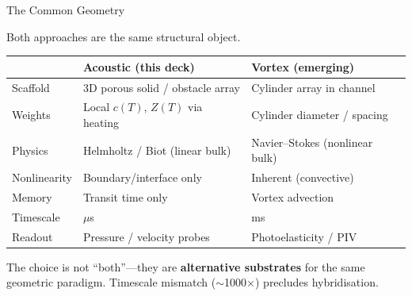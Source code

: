 \documentclass[aspectratio=169,11pt]{beamer}
\begin{document}
\begin{frame}{The Common Geometry}
  \begin{center}
    \textcolor{gdpPurple}{\large Both approaches are the same structural object.}
  \end{center}

  \vspace{0.2cm}
  \footnotesize
  \begin{table}
    \centering
    \renewcommand{\arraystretch}{1.05}
    \begin{tabular}{@{}>{\raggedright}p{3.0cm}>{\raggedright}p{4.8cm}>{\raggedright\arraybackslash}p{5.2cm}@{}}
      \toprule
      & \textbf{Acoustic (this deck)} & \textbf{Vortex (emerging)} \\
      \midrule
      Scaffold & 3D porous solid / obstacle array & Cylinder array in channel \\
      Weights & Local $c(T)$, $Z(T)$ via heating & Cylinder diameter / spacing \\
      Physics & Helmholtz / Biot (linear bulk) & Navier--Stokes (nonlinear bulk) \\
      Nonlinearity & Boundary/interface only & Inherent (convective) \\
      Memory & Transit time only & Vortex advection \\
      Timescale & $\mu$s & ms \\
      Readout & Pressure / velocity probes & Photoelasticity / PIV \\
      \bottomrule
    \end{tabular}
  \end{table}

  \vspace{0.2cm}
  \textcolor{gdpDarkBlue}{\small The choice is not ``both''---they are \textbf{alternative substrates} for the same geometric paradigm. Timescale mismatch ($\sim$1000$\times$) precludes hybridisation.}
\end{frame}
\end{document}
